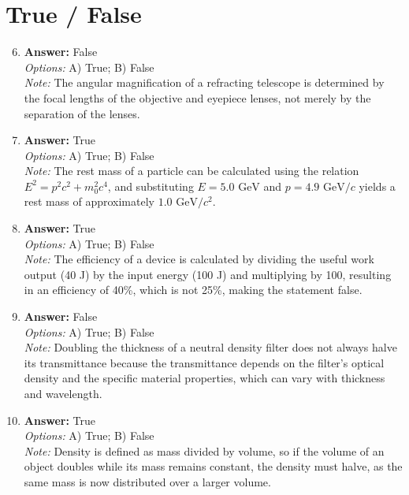 \documentclass[12pt]{article}
\begin{document}
\section*{True / False}
\begin{enumerate}[label=\arabic*.]
\setcounter{enumi}{5}
\item \textbf{Answer:} False
\\ \textit{Options:} A) True; B) False
\\ \textit{Note:} The angular magnification of a refracting telescope is determined by the focal lengths of the objective and eyepiece lenses, not merely by the separation of the lenses.
\item \textbf{Answer:} True
\\ \textit{Options:} A) True; B) False
\\ \textit{Note:} The rest mass of a particle can be calculated using the relation \(E^2 = p^2 c^2 + m_0^2 c^4\), and substituting \(E = 5.0 \text{ GeV}\) and \(p = 4.9 \text{ GeV}/c\) yields a rest mass of approximately \(1.0 \text{ GeV}/c^2\).
\item \textbf{Answer:} True
\\ \textit{Options:} A) True; B) False
\\ \textit{Note:} The efficiency of a device is calculated by dividing the useful work output (40 J) by the input energy (100 J) and multiplying by 100, resulting in an efficiency of 40\%, which is not 25\%, making the statement false.
\item \textbf{Answer:} False
\\ \textit{Options:} A) True; B) False
\\ \textit{Note:} Doubling the thickness of a neutral density filter does not always halve its transmittance because the transmittance depends on the filter's optical density and the specific material properties, which can vary with thickness and wavelength.
\item \textbf{Answer:} True
\\ \textit{Options:} A) True; B) False
\\ \textit{Note:} Density is defined as mass divided by volume, so if the volume of an object doubles while its mass remains constant, the density must halve, as the same mass is now distributed over a larger volume.
\end{enumerate}
\end{document}

